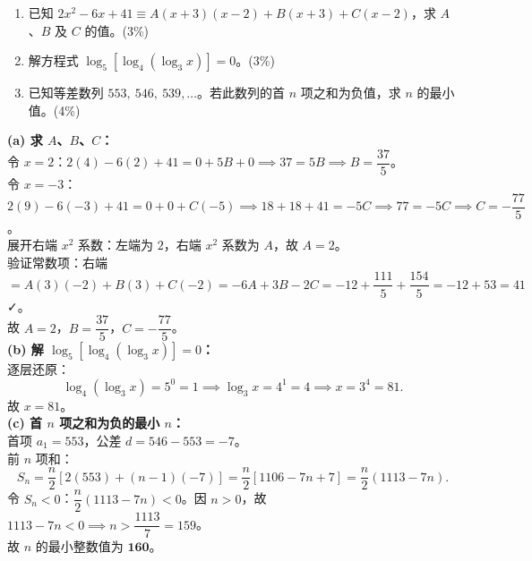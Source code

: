 \documentclass[12pt,a4paper]{exam-zh}
\begin{document}


\begin{question}
    \begin{enumerate}[label=(\alph*)]
        \item 已知 $2x^2 - 6x + 41 \equiv A(x+3)(x-2) + B(x+3) + C(x-2)$，求 $A$、$B$ 及 $C$ 的值。\hfill(3\%)
        \item 解方程式 $\log_5[\log_4(\log_3 x)] = 0$。\hfill(3\%)
        \item 已知等差数列 $553,\ 546,\ 539,\ldots$。若此数列的首 $n$ 项之和为负值，求 $n$ 的最小值。\hfill(4\%)
    \end{enumerate}
\end{question}

\begin{solution}
    \textbf{(a) 求 $A$、$B$、$C$：} \\
    令 $x = 2$：$2(4) - 6(2) + 41 = 0 + 5B + 0 \implies 37 = 5B \implies B = \dfrac{37}{5}$。\\
    令 $x = -3$：$2(9) - 6(-3) + 41 = 0 + 0 + C(-5) \implies 18+18+41 = -5C \implies 77 = -5C \implies C = -\dfrac{77}{5}$。\\
    展开右端 $x^2$ 系数：左端为 $2$，右端 $x^2$ 系数为 $A$，故 $A = 2$。\\
    验证常数项：右端 $= A(3)(-2) + B(3) + C(-2) = -6A + 3B - 2C = -12 + \dfrac{111}{5} + \dfrac{154}{5} = -12 + 53 = 41$ ✓。\\
    故 $A = 2$，$B = \dfrac{37}{5}$，$C = -\dfrac{77}{5}$。\\

    \textbf{(b) 解 $\log_5[\log_4(\log_3 x)] = 0$：} \\
    逐层还原：
    \[
        \log_4(\log_3 x) = 5^0 = 1
        \implies \log_3 x = 4^1 = 4
        \implies x = 3^4 = 81.
    \]
    故 $x = 81$。\\

    \textbf{(c) 首 $n$ 项之和为负的最小 $n$：} \\
    首项 $a_1 = 553$，公差 $d = 546 - 553 = -7$。\\
    前 $n$ 项和：
    \[
        S_n = \frac{n}{2}[2(553) + (n-1)(-7)] = \frac{n}{2}[1106 - 7n + 7] = \frac{n}{2}(1113 - 7n).
    \]
    令 $S_n < 0$：$\dfrac{n}{2}(1113 - 7n) < 0$。因 $n > 0$，故 $1113 - 7n < 0 \implies n > \dfrac{1113}{7} = 159$。\\
    故 $n$ 的最小整数值为 $\mathbf{160}$。
\end{solution}
\end{document}

